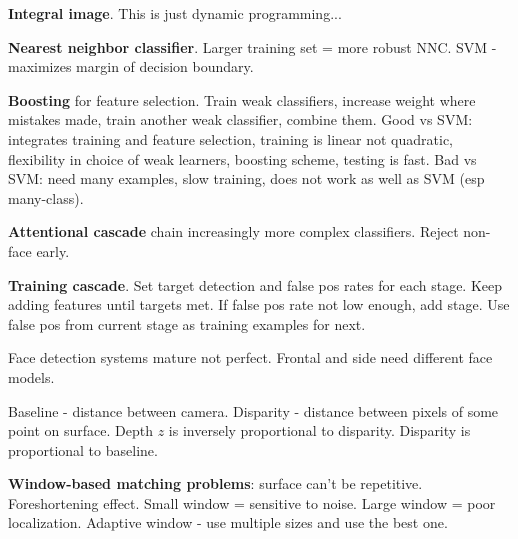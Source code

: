\documentclass[twocolumn]{zett}
\begin{document}
\begin{node}
  \textbf{Integral image}.
  This is just dynamic programming...
\end{node}

\begin{node}
  \textbf{Nearest neighbor classifier}.
  Larger training set = more robust NNC.
  SVM - maximizes margin of decision boundary.
\end{node}

\begin{node}
  \textbf{Boosting} for feature selection.
  Train weak classifiers, increase weight where mistakes made, train another weak classifier, combine them.
  Good vs SVM: integrates training and feature selection, training is linear not quadratic, flexibility in choice of weak learners, boosting scheme, testing is fast.
  Bad vs SVM: need many examples, slow training, does not work as well as SVM (esp many-class).
\end{node}

\begin{node}
  \textbf{Attentional cascade} chain increasingly more complex classifiers.
  Reject non-face early.
\end{node}

\begin{node}
  \textbf{Training cascade}.
  Set target detection and false pos rates for each stage.
  Keep adding features until targets met.
  If false pos rate not low enough, add stage.
  Use false pos from current stage as training examples for next.
\end{node}

\begin{node}
  Face detection systems mature not perfect.
  Frontal and side need different face models.
\end{node}

\begin{node}
  Baseline - distance between camera.
  Disparity - distance between pixels of some point on surface.
  Depth $z$ is inversely proportional to disparity.
  Disparity is proportional to baseline.
\end{node}

\begin{node}
  \textbf{Window-based matching problems}: surface can't be repetitive.
  Foreshortening effect.
  Small window = sensitive to noise.
  Large window = poor localization.
  Adaptive window - use multiple sizes and use the best one.
\end{node}
\end{document}
